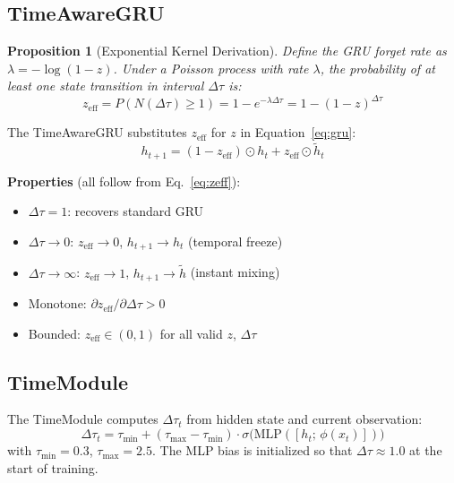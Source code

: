 \documentclass[10pt,twocolumn]{article}
\newcommand{\deltatau}{\Delta\tau}
\newcommand{\dteff}{z_\text{eff}}
\theoremstyle{plain}
\newtheorem{proposition}[theorem]{Proposition}
\theoremstyle{definition}
\begin{document}
\subsection{TimeAwareGRU}

\begin{proposition}[Exponential Kernel Derivation]
\label{prop:kernel}
Define the GRU forget rate as $\lambda = -\log(1-z)$.
Under a Poisson process with rate $\lambda$, the probability of at least one
state transition in interval $\deltatau$ is:
\begin{equation}
  \dteff = P(N(\deltatau) \geq 1) = 1 - e^{-\lambda \deltatau}
    = 1 - (1-z)^{\deltatau}
  \label{eq:zeff}
\end{equation}
\end{proposition}

The TimeAwareGRU substitutes $\dteff$ for $z$ in Equation~\ref{eq:gru}:
\begin{equation}
  h_{t+1} = (1 - \dteff) \odot h_t + \dteff \odot \tilde{h}_t
  \label{eq:tagru}
\end{equation}

\textbf{Properties} (all follow from Eq.~\ref{eq:zeff}):
\begin{itemize}[leftmargin=*,itemsep=1pt,topsep=2pt]
  \item $\deltatau = 1$: recovers standard GRU
  \item $\deltatau \to 0$: $\dteff \to 0$, $h_{t+1} \to h_t$ (temporal freeze)
  \item $\deltatau \to \infty$: $\dteff \to 1$, $h_{t+1} \to \tilde{h}$ (instant mixing)
  \item Monotone: $\partial \dteff / \partial \deltatau > 0$
  \item Bounded: $\dteff \in (0,1)$ for all valid $z$, $\deltatau$
\end{itemize}

\subsection{TimeModule}

The TimeModule computes $\deltatau_t$ from hidden state and current observation:
\begin{equation}
  \deltatau_t = \tau_{\min} + (\tau_{\max} - \tau_{\min}) \cdot
    \sigma\bigl(\mathrm{MLP}([h_t;\, \phi(x_t)])\bigr)
  \label{eq:timemodule}
\end{equation}
with $\tau_{\min}=0.3$, $\tau_{\max}=2.5$. The MLP bias is initialized so
that $\deltatau \approx 1.0$ at the start of training.
\end{document}
